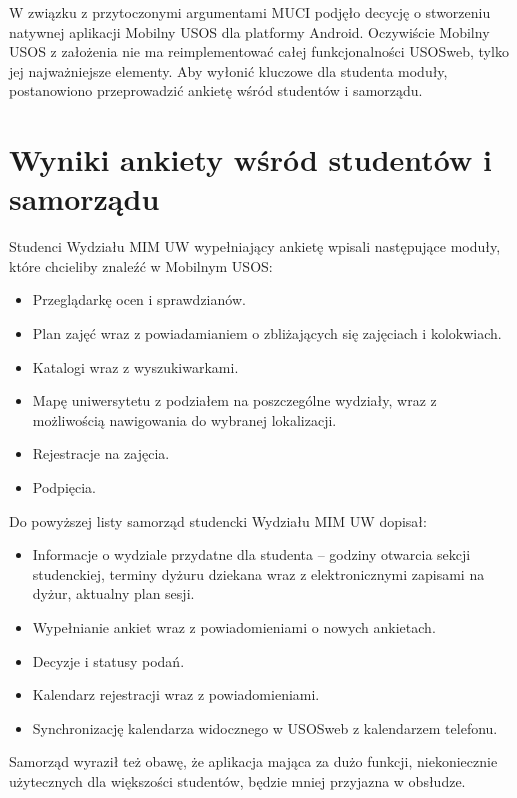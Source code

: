 \documentclass{pracamgr}
\begin{document}
W związku z przytoczonymi argumentami MUCI podjęło decycję o stworzeniu natywnej
aplikacji Mobilny USOS dla platformy Android. Oczywiście Mobilny USOS z założenia
nie ma reimplementować całej funkcjonalności USOSweb, tylko jej najważniejsze
elementy. Aby wyłonić kluczowe dla studenta moduły, postanowiono przeprowadzić
ankietę wśród studentów i samorządu.


\section{Wyniki ankiety wśród studentów i samorządu}

Studenci Wydziału MIM UW wypełniający ankietę wpisali następujące moduły, które
chcieliby znaleźć w Mobilnym USOS:

\begin{itemize}
	\item Przeglądarkę ocen i sprawdzianów.
	\item Plan zajęć wraz z powiadamianiem o zbliżających się zajęciach
	      i kolokwiach.
	\item Katalogi wraz z wyszukiwarkami.
	\item Mapę uniwersytetu z podziałem na poszczególne wydziały, wraz z
	      możliwością nawigowania do wybranej lokalizacji.
	\item Rejestracje na zajęcia.
	\item Podpięcia.
\end{itemize}

Do powyższej listy samorząd studencki Wydziału MIM UW dopisał:

\begin{itemize}
	\item Informacje o wydziale przydatne dla studenta -- godziny otwarcia sekcji
	      studenckiej, terminy dyżuru dziekana wraz z elektronicznymi zapisami na
	      dyżur, aktualny plan sesji.
	\item Wypełnianie ankiet wraz z powiadomieniami o nowych ankietach.
	\item Decyzje i statusy podań.
	\item Kalendarz rejestracji wraz z powiadomieniami.
	\item Synchronizację kalendarza widocznego w USOSweb z kalendarzem telefonu.
\end{itemize}
Samorząd wyraził też obawę, że aplikacja mająca za dużo funkcji, niekoniecznie
użytecznych dla większości studentów, będzie mniej przyjazna w obsłudze.
\end{document}
